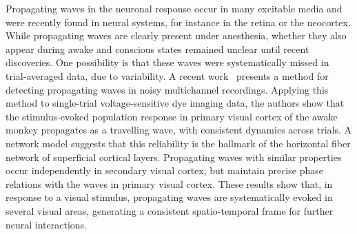 \documentclass[brainsci, %
               review,submit,pdftex,moreauthors
               ]{Definitions/mdpi}
\begin{document}
Propagating waves in the neuronal response occur in many excitable media and were recently found in neural systems, for instance in the retina or the neocortex. While propagating waves are clearly present under anesthesia, whether they also appear during awake and conscious states remained unclear until recent discoveries. One possibility is that these waves were systematically missed in trial-averaged data, due to variability. A recent work~\citep{muller_stimulus-evoked_2014} presents a method for detecting propagating waves in noisy multichannel recordings. Applying this method to single-trial voltage-sensitive dye imaging data, the authors show that the stimulus-evoked population response in primary visual cortex of the awake monkey propagates as a travelling wave, with consistent dynamics across trials. A network model suggests that this reliability is the hallmark of the horizontal fiber network of superficial cortical layers. Propagating waves with similar properties occur independently in secondary visual cortex, but maintain precise phase relations with the waves in primary visual cortex. These results show that, in response to a visual stimulus, propagating waves are systematically evoked in several visual areas, generating a consistent spatio-temporal frame for further neural interactions.

\end{document}
